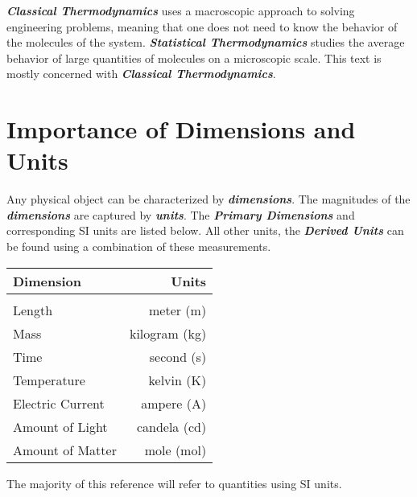 \vspace{0.1in}
\textbf{\textit{Classical Thermodynamics}} uses a macroscopic approach to solving engineering problems, meaning that one does not need to know the behavior of the molecules of the system. \textbf{\textit{Statistical Thermodynamics}} studies the average behavior of large quantities of molecules on a microscopic scale. This text is mostly concerned with \textbf{\textit{Classical Thermodynamics}}.

\section{Importance of Dimensions and Units}
Any physical object can be characterized by \textbf{\textit{dimensions}}. The magnitudes of the \textbf{\textit{dimensions}} are captured by \textbf{\textit{units}}. The \textbf{\textit{Primary Dimensions}} and corresponding SI units are listed below. All other units, the \textbf{\textit{Derived Units}} can be found using a combination of these measurements.
%
\begin{table}[b]
\begin{center}
\label{Primary Dimensions}
\begin{tabular}{lr}
\textbf{Dimension} & \textbf{Units}\\
\hline\\
Length & meter (m)\\
Mass & kilogram (kg)\\
Time & second (s)\\
Temperature & kelvin (K)\\
Electric Current & ampere (A)\\
Amount of Light & candela (cd)\\
Amount of Matter & mole (mol)
\end{tabular}
\end{center}
\end{table}
%
The majority of this reference will refer to quantities using SI units.

